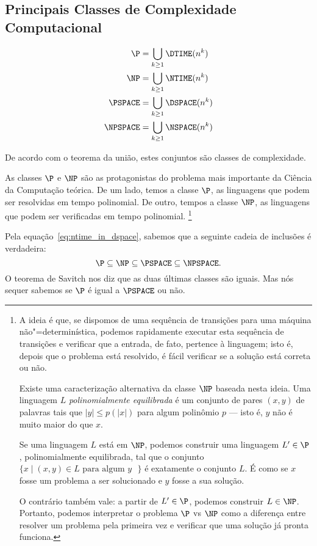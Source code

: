 \subsection{Principais Classes de Complexidade Computacional}
\label{sec:standard_classes}

\begin{definition}
    \begin{align*}
        \P &= \bigcup_{k \geq 1} \DTIME(n^k) \\
        \NP &= \bigcup_{k \geq 1} \NTIME(n^k) \\
        \PSPACE &= \bigcup_{k \geq 1} \DSPACE(n^k) \\
        \NPSPACE &= \bigcup_{k \geq 1} \NSPACE(n^k) \\
    \end{align*}
\end{definition}

De acordo com o teorema da união,
estes conjuntos são classes de complexidade.

As classes $\P$ e $\NP$ são as protagonistas
do problema mais importante da Ciência da Computação teórica.
De um lado, temos a classe $\P$,
as linguagens que podem ser resolvidas em tempo polinomial.
De outro, tempos a classe $\NP$,
as linguagens que podem ser verificadas em tempo polinomial.%
\footnote{
    \label{foot:polinomially_balanced}
    A ideia é que,
    se dispomos de uma sequência de transições para uma máquina não"=determinística,
    podemos rapidamente executar esta sequência de transições
    e verificar que a entrada, de fato, pertence à linguagem;
    isto é, depois que o problema está resolvido,
    é fácil verificar se a solução está correta ou não.

    Existe uma caracterização alternativa da classe $\NP$ baseada nesta ideia.
    Uma linguagem $L$ \emph{polinomialmente equilibrada}
    é um conjunto de pares $(x, y)$ de palavras
    tais que $|y| \leq p(|x|)$ para algum polinômio $p$
    \cite[p.~298]{Papadimitriou1998}
    --- isto é, $y$ não é muito maior do que $x$.

    Se uma linguagem $L$ está em $\NP$,
    podemos construir uma linguagem $L' \in \P$,
    polinomialmente equilibrada,
    tal que o conjunto $\{x \mid (x, y) \in L \text{ para algum $y$ }\}$
    é exatamente o conjunto $L$.
    É como se $x$ fosse um problema a ser solucionado
    e $y$ fosse a sua solução.

    O contrário também vale: a partir de $L' \in \P$,
    podemos construir $L \in \NP$.
    Portanto, podemos interpretar o problema $\P$ vs $\NP$
    como a diferença entre resolver um problema pela primeira vez
    e verificar que uma solução já pronta funciona.
}

Pela equação~\ref{eq:ntime_in_dspace},
sabemos que a seguinte cadeia de inclusões é verdadeira:
\begin{equation*}
    \P \subseteq \NP \subseteq \PSPACE \subseteq \NPSPACE.
\end{equation*}
O teorema de Savitch nos diz que as duas últimas classes são iguais.
Mas nós sequer sabemos se $\P$ é igual a $\PSPACE$ ou não.
